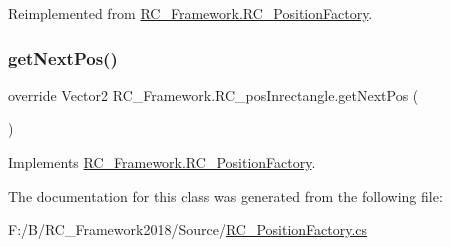 Reimplemented from \mbox{\hyperlink{class_r_c___framework_1_1_r_c___position_factory_a39eaa0f4f1dfd07225b4880d494d81fa}{R\+C\+\_\+\+Framework.\+R\+C\+\_\+\+Position\+Factory}}.

\mbox{\label{class_r_c___framework_1_1_r_c__pos_inrectangle_aafd0da0c3d4742c9aade81342125af81}} 
\subsubsection{\texorpdfstring{get\+Next\+Pos()}{getNextPos()}}
{\footnotesize\ttfamily override Vector2 R\+C\+\_\+\+Framework.\+R\+C\+\_\+pos\+Inrectangle.\+get\+Next\+Pos (\begin{DoxyParamCaption}{ }\end{DoxyParamCaption})\hspace{0.3cm}{\ttfamily [virtual]}}



Implements \mbox{\hyperlink{class_r_c___framework_1_1_r_c___position_factory_aab6cd4cb6a10c8dfa126c4930c6a9fbf}{R\+C\+\_\+\+Framework.\+R\+C\+\_\+\+Position\+Factory}}.



The documentation for this class was generated from the following file\+:\begin{DoxyCompactItemize}
\item 
F\+:/\+B/\+R\+C\+\_\+\+Framework2018/\+Source/\mbox{\hyperlink{_r_c___position_factory_8cs}{R\+C\+\_\+\+Position\+Factory.\+cs}}\end{DoxyCompactItemize}
